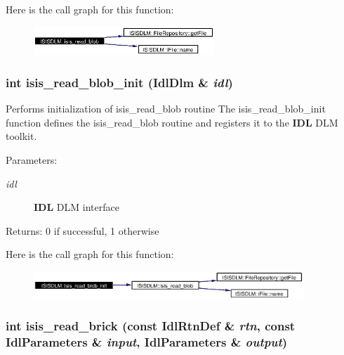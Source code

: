 Here is the call graph for this function:\begin{figure}[H]
\begin{center}
\leavevmode
\includegraphics[width=193pt]{namespaceISISDLM_a29_cgraph}
\end{center}
\end{figure}
\subsubsection{\setlength{\rightskip}{0pt plus 5cm}int isis\_\-read\_\-blob\_\-init (Idl\-Dlm \& {\em idl})}\label{namespaceISISDLM_a28}


Performs initialization of isis\_\-read\_\-blob routine The isis\_\-read\_\-blob\_\-init function defines the isis\_\-read\_\-blob routine and registers it to the {\bf IDL} DLM toolkit. \begin{Desc}
\item[Parameters:]
\begin{description}
\item[{\em idl}]{\bf IDL} DLM interface \end{description}
\end{Desc}
\begin{Desc}
\item[Returns:]0 if successful, 1 otherwise \end{Desc}


Here is the call graph for this function:\begin{figure}[H]
\begin{center}
\leavevmode
\includegraphics[width=288pt]{namespaceISISDLM_a28_cgraph}
\end{center}
\end{figure}
\subsubsection{\setlength{\rightskip}{0pt plus 5cm}int isis\_\-read\_\-brick (const Idl\-Rtn\-Def \& {\em rtn}, const Idl\-Parameters \& {\em input}, Idl\-Parameters \& {\em output})}\label{namespaceISISDLM_a31}


